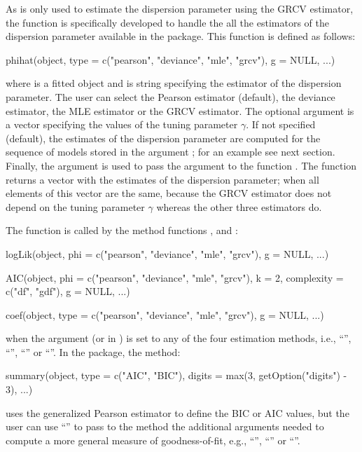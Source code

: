 As  is only used to estimate the dispersion parameter using the GRCV estimator, the function  is specifically developed to handle the all the estimators of the dispersion parameter available in the  package. This function is defined as follows:
%
\begin{example}
phihat(object, type = c("pearson", "deviance", "mle", "grcv"), g = NULL, ...)
\end{example}
%
where  is a fitted  object and  is string specifying the estimator of the dispersion parameter. The user can select the Pearson estimator (default), the deviance estimator, the MLE estimator or the GRCV estimator. The optional argument  is a vector specifying the values of the tuning parameter $\gamma$. If not specified (default), the estimates of the dispersion parameter are computed for the sequence of models stored in the argument ; for an example see next section. Finally, the argument  is used to pass the argument to the function . The function  returns a vector with the estimates of the dispersion parameter; when  all elements of this vector are the same, because the GRCV estimator does not depend on the tuning parameter $\gamma$ whereas the other three estimators do. 

The function  is called by the method functions ,  and :
%	
\begin{example}
logLik(object, phi = c("pearson", "deviance", "mle", "grcv"), g = NULL, ...)

AIC(object, phi = c("pearson", "deviance", "mle", "grcv"), k = 2,
    complexity = c("df", "gdf"), g = NULL, ...)

coef(object, type = c("pearson", "deviance", "mle", "grcv"), g = NULL, ...)
\end{example}
%
when the argument  (or  in ) is set to any of the four estimation methods, i.e., ``'', ``'', ``'' or ``''.
%
In the  package, the  method:
\begin{example}
summary(object, type = c("AIC", "BIC"), digits = max(3, getOption("digits") - 3), ...)
\end{example}
uses the generalized Pearson estimator to define the BIC or AIC values, but the user can use ``'' to pass to the method  the additional arguments needed to compute a more general measure of goodness-of-fit, e.g., ``'', ``'' or ``''.  

